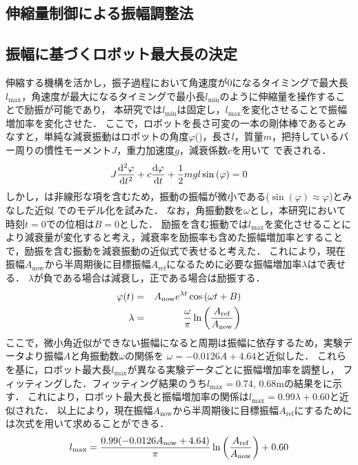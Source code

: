\begin{small}
\section{伸縮量制御による振幅調整法}
\vspace{-2mm}
\subsection{振幅に基づくロボット最大長の決定}
伸縮する機構を活かし，振子過程において角速度が0になるタイミングで最大長$l_{\mathrm{max}}$，角速度が最大になるタイミングで最小長$l_{\mathrm{min}}$のように伸縮量を操作することで励振が可能であり，
本研究では$l_{\mathrm{min}}$は固定し，$l_{\mathrm{max}}$を変化させることで振幅増加率を変化させた．
ここで，ロボットを長さ可変の一本の剛体棒であるとみなすと，単純な減衰振動はロボットの角度$\varphi$()，長さ$l$，質量$m$，把持しているバー周りの慣性モーメント$J$，重力加速度$g$，減衰係数$c$を用いて
で表される．
\vspace{-2mm}
\begin{eqnarray}
  \equlabel{equation}
  J \frac{\mathrm{d}^2 \varphi}{\mathrm{d} t^2} +c \frac{\mathrm{d}\varphi}{\mathrm{d} t}+\frac{1}{2}mgl \sin{(\varphi)}=0
\end{eqnarray}
しかし，は非線形な項を含むため，振動の振幅が微小である($\sin{(\varphi)}\approx \varphi$)とみなした近似
でのモデル化を試みた．
なお，角振動数を$\omega$とし，本研究において時刻$t=0$での位相は$B=0$とした．
励振を含む振動では$l_{\mathrm{max}}$を変化させることにより減衰量が変化すると考え，減衰率を励振率も含めた振幅増加率とすることで，励振を含む振動を減衰振動の近似式で表せると考えた．
これにより，現在振幅$A_{\mathrm{now}}$から半周期後に目標振幅$A_{\mathrm{ref}}$になるために必要な振幅増加率$\lambda$はで表せる．
$\lambda$が負である場合は減衰し，正である場合は励振する．
\vspace{-2mm}
\begin{eqnarray}
  \equlabel{Approximation Model}
  \varphi(t)&=&A_{\mathrm{now}}e^{\lambda t}\cos{(\omega t + B)}\\
  \equlabel{lambda}
            \lambda&=&\frac{\omega}{\pi}\ln{\left(\frac{A_{\mathrm{ref}}}{A_{\mathrm{now}}}\right)}
\end{eqnarray}
ここで，微小角近似ができない振幅になると周期は振幅に依存するため，実験データより振幅$A$と角振動数$\omega$の関係を
$\omega=-0.0126A+4.64$と近似した．
これらを基に，ロボット最大長$l_{\mathrm{max}}$が異なる実験データごとに振幅増加率を調整し，
フィッティングした．フィッティング結果のうち$l_{\mathrm{max}}=$0.74, 0.68mの結果をに示す．
これにより，ロボット最大長と振幅増加率の関係は$l_{\mathrm{max}}=0.99\lambda+0.60$と近似された．
以上により，現在振幅$A_{\mathrm{now}}$から半周期後に目標振幅$A_{\mathrm{ref}}$にするためには次式を用いて求めることができる．
\vspace{-1mm}
\begin{eqnarray}
  \equlabel{l status}
  l_{\mathrm{max}}=\frac{0.99(-0.0126A_{\mathrm{now}}+4.64)}{\pi}\ln{\left(\frac{A_{\mathrm{ref}}}{A_{\mathrm{now}}}\right)}+0.60 \nonumber
\end{eqnarray}

\end{small}
